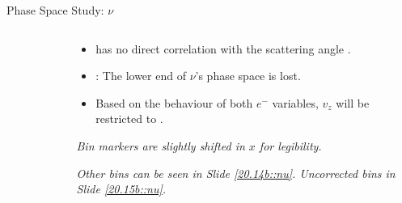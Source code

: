 \begin{frame}{Phase Space Study: $\nu$}
    \label{12.13::nu}

    \begin{columns}[onlytextwidth,T]

    \begin{column}{.48\linewidth}
        \vspace{-15pt}
        \begin{center}
            \begin{figure}[t]
            \end{figure}
        \end{center}
    \end{column}

    \begin{column}{.50\linewidth}
        \begin{itemize}
            \item
                \ef{$\nu$} has no direct correlation with the scattering angle .

            \vspace{12pt}
            \item
                : The lower end of $\nu$'s phase space is lost.

            \vspace{12pt}
            \item
                Based on the behaviour of both $e^-$ variables, $v_z$ will be restricted to .
        \end{itemize}

        \vspace{66pt}

        \begin{flushright}
            \tiny{\textit{Bin markers are slightly shifted in $x$ for legibility.}}

            \tiny{\textit{
                Other bins can be seen in Slide \textcolor{efd_purple}{\ref{20.14b::nu}}.
                Uncorrected bins in Slide \textcolor{efd_purple}{\ref{20.15b::nu}}.
            }}
        \end{flushright}
    \end{column}

    \end{columns}
\end{frame}

